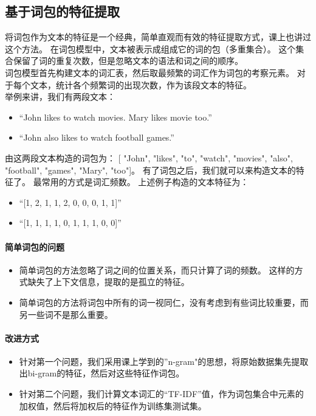 \subsection{基于词包的特征提取}
将词包作为文本的特征是一个经典，简单直观而有效的特征提取方式，课上也讲过这个方法。
在词包模型中，文本被表示成组成它的词的包（多重集合）。
这个集合保留了词的重复次数，但是忽略文本的语法和词之间的顺序。\\
词包模型首先构建文本的词汇表，然后取最频繁的词汇作为词包的考察元素。
对于每个文本，统计各个频繁词的出现次数，作为该段文本的特征。\\
举例来讲，我们有两段文本：
\begin{itemize}
	\item
	``John likes to watch movies. Mary likes movie too.''
	\item
	``John also likes to watch football games.''
\end{itemize}
由这两段文本构造的词包为：
[ "John", "likes", "to", "watch", "movies", "also", "football", "games", "Mary", "too"]。
有了词包之后，我们就可以来构造文本的特征了。
最常用的方式是词汇频数。
上述例子构造的文本特征为：
\begin{itemize}
	\item
	``[1, 2, 1, 1, 2, 0, 0, 0, 1, 1]''
	\item
	``[1, 1, 1, 1, 0, 1, 1, 1, 0, 0]''
\end{itemize}



\paragraph{简单词包的问题}
\begin{itemize}
	\item
	简单词包的方法忽略了词之间的位置关系，而只计算了词的频数。
	这样的方式缺失了上下文信息，提取的是孤立的特征。
	\item
	简单词包的方法将词包中所有的词一视同仁，没有考虑到有些词比较重要，而另一些词不是那么重要。
\end{itemize}
\paragraph{改进方式}
\begin{itemize}
	\item
	针对第一个问题，我们采用课上学到的”n-gram"的思想，将原始数据集先提取出bi-gram的特征，然后对这些特征作词包。
	\item
	针对第二个问题，我们计算文本词汇的“TF-IDF”值，作为词包集合中元素的加权值，然后将加权后的特征作为训练集测试集。
\end{itemize}

